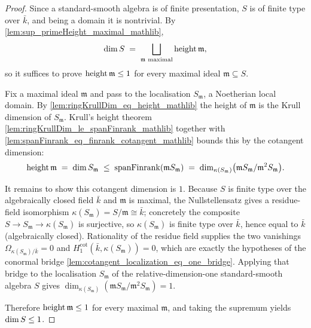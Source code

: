 \begin{proof}
        \leanok
  Since a standard-smooth algebra is of finite presentation, \(S\) is of finite type
  over \(\bar k\), and being a domain it is nontrivial.  By
  \cref{lem:sup_primeHeight_maximal_mathlib},
  \[
    \dim S \;=\; \bigsqcup_{\mathfrak m \text{ maximal}} \operatorname{height} \mathfrak m ,
  \]
  so it suffices to prove \(\operatorname{height} \mathfrak m \le 1\) for every maximal ideal
  \(\mathfrak m \subseteq S\).

  Fix a maximal ideal \(\mathfrak m\) and pass to the localisation \(S_\mathfrak m\),
  a Noetherian local domain.  By \cref{lem:ringKrullDim_eq_height_mathlib} the height
  of \(\mathfrak m\) is the Krull dimension of \(S_\mathfrak m\).  Krull's height
  theorem \cref{lem:ringKrullDim_le_spanFinrank_mathlib} together with
  \cref{lem:spanFinrank_eq_finrank_cotangent_mathlib} bounds this by the cotangent
  dimension:
  \[
    \operatorname{height} \mathfrak m \;=\; \dim S_\mathfrak m
      \;\le\; \operatorname{spanFinrank}(\mathfrak m S_\mathfrak m)
      \;=\; \dim_{\kappa(S_\mathfrak m)}\bigl(\mathfrak m S_\mathfrak m / \mathfrak m^2
      S_\mathfrak m\bigr).
  \]

  It remains to show this cotangent dimension is \(1\).  Because \(S\) is finite type
  over the algebraically closed field \(\bar k\) and \(\mathfrak m\) is maximal, the
  Nullstellensatz gives a residue-field isomorphism \(\kappa(S_\mathfrak m) = S/\mathfrak
  m \cong \bar k\); concretely the composite \(S \to S_\mathfrak m \to \kappa(S_\mathfrak
  m)\) is surjective, so \(\kappa(S_\mathfrak m)\) is finite type over \(\bar k\), hence
  equal to \(\bar k\) (algebraically closed).  Rationality of the residue field supplies
  the two vanishings \(\Omega_{\kappa(S_\mathfrak m)/\bar k} = 0\) and
  \(H_1^{\mathrm{cot}}(\bar k, \kappa(S_\mathfrak m)) = 0\), which are exactly the
  hypotheses of the conormal bridge
  \cref{lem:cotangent_localization_eq_one_bridge}.  Applying that bridge to the
  localisation \(S_\mathfrak m\) of the relative-dimension-one standard-smooth algebra
  \(S\) gives \(\dim_{\kappa(S_\mathfrak m)}(\mathfrak m S_\mathfrak m/\mathfrak
  m^2 S_\mathfrak m) = 1\).

  Therefore \(\operatorname{height} \mathfrak m \le 1\) for every maximal \(\mathfrak m\), and taking
  the supremum yields \(\dim S \le 1\).
\end{proof}

